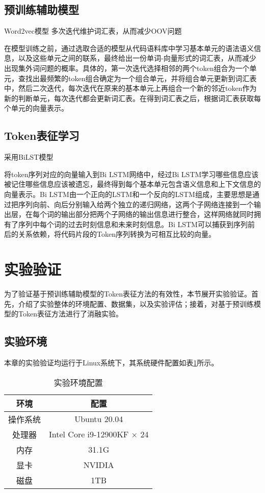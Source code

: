 \subsection{预训练辅助模型}
\label{subsec:Model}
Word2vec模型 多次迭代维护词汇表，从而减少OOV问题

在模型训练之前，通过选取合适的模型从代码语料库中学习基本单元的语法语义信息，以及这些单元之间的联系，最终给出一份单词-向量形式的词汇表，从而减少出现集外词问题的概率。具体的，第一次迭代选择相邻的两个token组合为一个单元，查找出最频繁的token组合确定为一个组合单元，并将组合单元更新到词汇表中，然后二次迭代，每次迭代在原来的基本单元上再组合一个新的邻近token作为新的判断单元，每次迭代都会更新词汇表。在得到词汇表之后，根据词汇表获取每个单元的向量表示。
\subsection{Token表征学习}
\label{subsec:Token}
采用BiLST模型

将token序列对应的向量输入到Bi LSTM网络中，经过Bi LSTM学习哪些信息应该被记住哪些信息应该被遗忘，最终得到每个基本单元包含语义信息和上下文信息的向量表示。Bi LSTM由一个正向的LSTM和一个反向的LSTM组成，主要思想是通过把序列向前、向后分别输入给两个独立的递归网络，这两个子网络连接到一个输出层，在每个词的输出部分把两个子网络的输出信息进行整合，这样网络就同时拥有了序列中每个词的过去时刻信息和未来时刻信息。Bi LSTM可以捕获到序列前后的关系依赖，将代码片段的Token序列转换为可相互比较的向量。

\section{实验验证}
\label{sec:Experiment}
为了验证基于预训练辅助模型的Token表征方法的有效性，本节展开实验验证。首先，介绍了实验整体的环境配置、数据集，以及实验评估；接着，对基于预训练模型的Token表征方法进行了消融实验。

\subsection{实验环境}
\label{subsec:Environment}
本章的实验验证均运行于Linux系统下，其系统硬件配置如表\ref{tab:environment}所示。

\begin{table}[H]
  \centering
  \caption{实验环境配置} 
  \label{tab:environment}
  \begin{tabular*}{0.6\textwidth}{@{\extracolsep{\fill}}cc}
  \toprule
    环境			&配置		\\
  \midrule
    操作系统		&Ubuntu 20.04 \\
    处理器			&Intel Core i9-12900KF × 24 \\
    内存			  &31.1G \\
    显卡			  &NVIDIA  \\
    磁盘			  &1TB \\
  \bottomrule
  \end{tabular*}
\end{table}

